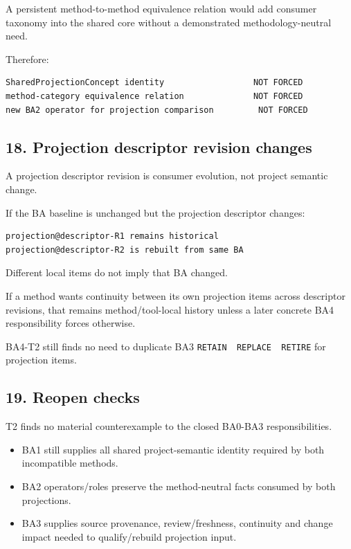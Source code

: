 \documentclass[11pt,a4paper]{article}
\providecommand{\tightlist}{\setlength{\itemsep}{0pt}\setlength{\parskip}{0pt}}
\begin{document}
A persistent method-to-method equivalence relation would add consumer
taxonomy into the shared core without a demonstrated methodology-neutral
need.

Therefore:

\begin{verbatim}
SharedProjectionConcept identity                  NOT FORCED
method-category equivalence relation              NOT FORCED
new BA2 operator for projection comparison         NOT FORCED
\end{verbatim}

\subsection{18. Projection descriptor revision
changes}\label{18-projection-descriptor-revision-changes}

A projection descriptor revision is consumer evolution, not project
semantic change.

If the BA baseline is unchanged but the projection descriptor changes:

\begin{verbatim}
projection@descriptor-R1 remains historical
projection@descriptor-R2 is rebuilt from same BA
\end{verbatim}

Different local items do not imply that BA changed.

If a method wants continuity between its own projection items across
descriptor revisions, that remains method/tool-local history unless a
later concrete BA4 responsibility forces otherwise.

BA4-T2 still finds no need to duplicate BA3
\texttt{RETAIN\ \textbar{}\ REPLACE\ \textbar{}\ RETIRE} for projection
items.

\subsection{19. Reopen checks}\label{19-reopen-checks}

T2 finds no material counterexample to the closed BA0-BA3
responsibilities.

\begin{itemize}
\tightlist
\item
  BA1 still supplies all shared project-semantic identity required by
  both incompatible methods.
\item
  BA2 operators/roles preserve the method-neutral facts consumed by both
  projections.
\item
  BA3 supplies source provenance, review/freshness, continuity and
  change impact needed to qualify/rebuild projection input.
\end{itemize}
\end{document}
